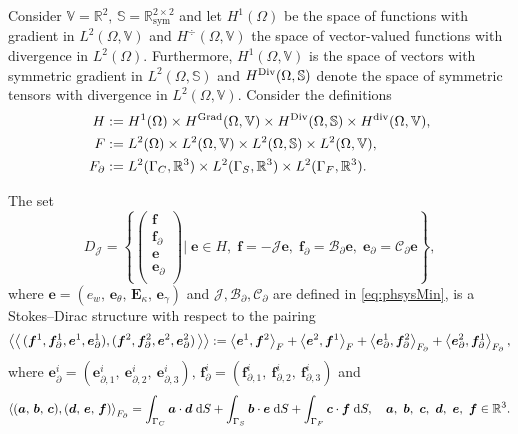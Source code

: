 \begin{theorem}\label{th:stdirMin}
Consider $\mathbb{V} = \mathbb{R}^2, \, \mathbb{S} = \mathbb{R}^{2\times 2}_{\text{sym}}$ and
let $H^{1}(\Omega)$ be the space of functions with gradient in $L^2(\Omega, \mathbb{V})$ and $H^{\div}  (\Omega, \mathbb{V})$ the space of vector-valued functions with divergence in $L^2(\Omega)$. Furthermore, $H^{1}(\Omega, \mathbb{V})$ is the space of vectors with symmetric gradient in $L^2(\Omega, \mathbb{S})$ and $H^{\Div}  (\Omega, \mathbb{S})$ denote the space of symmetric tensors with divergence in $L^2(\Omega, \mathbb{V})$. Consider the definitions 
\begin{align*}
H &:= H^{1}(\Omega) \times H^{\Grad}(\Omega, \mathbb{V}) \times H^{\Div}(\Omega, \mathbb{S}) \times H^{\div}(\Omega, \mathbb{V}), \\
F &:= L^2(\Omega) \times L^2(\Omega, \mathbb{V}) \times L^2(\Omega, \mathbb{S}) \times L^2(\Omega, \mathbb{V}), \\
F_\partial &:= L^2(\Gamma_C, \mathbb{R}^3) \times L^2(\Gamma_S, \mathbb{R}^3) \times L^2(\Gamma_F, \mathbb{R}^3). 
\end{align*}

The set 
\begin{equation}
{D}_{\mathcal{J}} = \left\{
\begin{pmatrix}
\bm{f} \\ \bm{f}_\partial \\ \bm{e} \\ \bm{e}_\partial \\
\end{pmatrix}
\vert \;
\bm{e} \in H, \; \bm{f} = -\mathcal{J} \bm{e}, \;\bm{f}_\partial = \mathcal{B}_\partial \bm{e}, \; \bm{e}_\partial = \mathcal{C}_\partial \bm{e}   \right\},
\end{equation}
where $\bm{e} = ({e}_w, \,\bm{e}_\theta, \, \bm{E}_\kappa, \, \bm{e}_\gamma)$ and $\mathcal{J, B_\partial, C_\partial}$ are defined in \eqref{eq:phsysMin}, is a Stokes–Dirac structure with respect to the pairing
\begin{equation}\label{eq:bilinearMin}
\bilprod{(\bm{f}^1, \bm{f}_{\partial}^1, \bm{e}^1, \bm{e}_{\partial}^1)}{(\bm{f}^2, \bm{f}_{\partial}^2, \bm{e}^2, \bm{e}_{\partial}^2)}  := \inner[F]{\bm{e}^1}{\bm{f}^2} + \inner[F]{\bm{e}^2}{\bm{f}^1} + \inner[F_\partial]{\bm{e}_{\partial}^1}{\bm{f}_{\partial}^2} + \inner[F_\partial]{\bm{e}_{\partial}^2}{\bm{f}_{\partial}^1},
\end{equation}
where $\bm{e}_{\partial}^i = (\bm{e}_{\partial, 1}^i, \ \bm{e}_{\partial, 2}^i, \ \bm{e}_{\partial, 3}^i), \, \bm{f}_{\partial}^i = (\bm{f}_{\partial, 1}^i, \ \bm{f}_{\partial, 2}^i, \ \bm{f}_{\partial, 3}^i)$ and
\begin{equation*}
\inner[F_\partial]{(\bm{a}, \, \bm{b}, \, \bm{c})}{(\bm{d}, \, \bm{e}, \, \bm{f})} = \int_{\Gamma_C} \bm{a} \cdot \bm{d} \d{S} + \int_{\Gamma_S} \bm{b} \cdot \bm{e} \d{S}  + \int_{\Gamma_F} \bm{c} \cdot \bm{f} \d{S}, \quad \bm{a},\ \bm{b},\ \bm{c},\ \bm{d},\ \bm{e},\ \bm{f} \in \mathbb{R}^3. 
\end{equation*}


\end{theorem}
